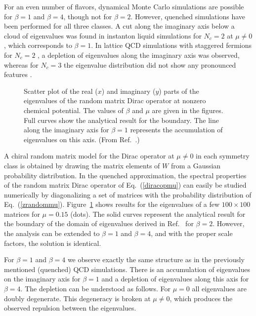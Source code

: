 For an even number of flavors, dynamical Monte Carlo simulations are
possible for $\beta =1$ and $\beta =4$, though not for
$\beta=2$. However, quenched simulations have been 
performed for all three classes.  A cut along the imaginary axis below
a cloud of eigenvalues was found in instanton liquid simulations
{\cite{Thomas}} for $N_c =2$ at $\mu \ne 0$, which corresponds to
$\beta =1$. In lattice QCD simulations with staggered fermions for
$N_c = 2$ {\cite{baillie}}, a depletion of eigenvalues along the
imaginary axis was observed, whereas for $N_c=3$ the eigenvalue
distribution did not show any pronounced features \cite{everybody}.
\begin{figure}
  \begin{center}
    \caption{Scatter plot of the real ($x$) and imaginary ($y$) parts 
      of the eigenvalues of the random matrix Dirac operator at
      nonzero chemical potential.  The values of $\beta$ and $\mu$ are
      given in the figures.  Full curves show the analytical
      result for the boundary.  The line along the imaginary axis for
      $\beta=1$ represents the accumulation of eigenvalues on this
      axis.  (From Ref.~\cite{Osbornmu}.)}
    \label{fig:scatter}
  \end{center}
\end{figure}

A chiral random matrix model for the Dirac operator at $\mu \ne 0$ in
each symmetry class is obtained by drawing the matrix elements of $W$
from a Gaussian probability distribution.  In the quenched
approximation, the spectral properties of the random matrix Dirac
operator of Eq.~(\ref{diracopmu}) can easily be studied numerically by
diagonalizing a set of matrices with the probability distribution
of Eq.~(\ref{zrandommu}).  Figure~\ref{fig:scatter} shows results
{\cite{Osbornmu}} for the eigenvalues of a few $100\times 100$
matrices for $\mu = 0.15$ (dots). The solid curves represent the
analytical result for the boundary of the domain of eigenvalues
derived in {Ref.~\cite{Misha}} for $\beta =2$. However, the analysis
can be extended {\cite{Osbornmu}} to $\beta = 1$ and $\beta
=4$, and with the proper scale factors, the solution is identical.
                                        
For $\beta =1$ and $\beta = 4$ we observe exactly the same structure
as in the previously mentioned (quenched) QCD simulations.  There is an
accumulation of eigenvalues on the imaginary axis for $\beta = 1$ and
a depletion of eigenvalues along this axis for $\beta = 4$.  The
depletion can be understood as follows. For $\mu = 0$ all eigenvalues
are doubly degenerate. This degeneracy is broken at $\mu\ne 0$, which
produces the observed repulsion between the eigenvalues.

